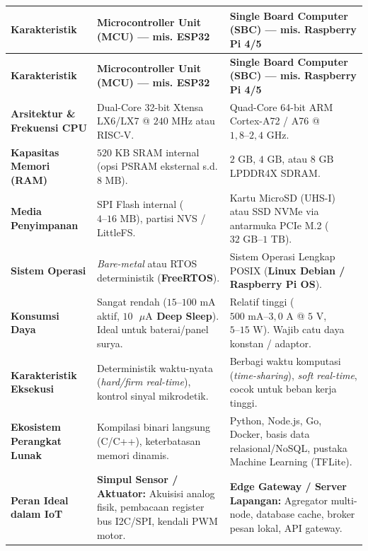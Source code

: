 \documentclass[11pt,a4paper]{article}
\begin{document}
{\small
\begin{longtable}{|L{2.8cm}|L{6.6cm}|L{6.6cm}|}
\hline
{}
\textbf{Karakteristik} & \textbf{Microcontroller Unit (MCU) --- mis. ESP32} & \textbf{Single Board Computer (SBC) --- mis. Raspberry Pi 4/5} \\
\hline
\endfirsthead
\hline
{}
\textbf{Karakteristik} & \textbf{Microcontroller Unit (MCU) --- mis. ESP32} & \textbf{Single Board Computer (SBC) --- mis. Raspberry Pi 4/5} \\
\hline
\endhead
\textbf{Arsitektur \& Frekuensi CPU} & Dual-Core 32-bit Xtensa LX6/LX7 @ $240\text{ MHz}$ atau RISC-V. & Quad-Core 64-bit ARM Cortex-A72 / A76 @ $1{,}8\text{--}2{,}4\text{ GHz}$. \\
\hline
\textbf{Kapasitas Memori (RAM)} & $520\text{ KB}$ SRAM internal (opsi PSRAM eksternal s.d. $8\text{ MB}$). & $2\text{ GB}$, $4\text{ GB}$, atau $8\text{ GB}$ LPDDR4X SDRAM. \\
\hline
\textbf{Media Penyimpanan} & SPI Flash internal ($4\text{--}16\text{ MB}$), partisi NVS / LittleFS. & Kartu MicroSD (UHS-I) atau SSD NVMe via antarmuka PCIe M.2 ($32\text{ GB}\text{--}1\text{ TB}$). \\
\hline
\textbf{Sistem Operasi} & \textit{Bare-metal} atau RTOS deterministik (\textbf{FreeRTOS}). & Sistem Operasi Lengkap POSIX (\textbf{Linux Debian / Raspberry Pi OS}). \\
\hline
\textbf{Konsumsi Daya} & Sangat rendah ($15\text{--}100\text{ mA}$ aktif, \textbf{$10\text{ }\mu\text{A}$ Deep Sleep}). Ideal untuk baterai/panel surya. & Relatif tinggi ($500\text{ mA}\text{--}3{,}0\text{ A}$ @ $5\text{ V}$, $5\text{--}15\text{ W}$). Wajib catu daya konstan / adaptor. \\
\hline
\textbf{Karakteristik Eksekusi} & Deterministik waktu-nyata (\textit{hard/firm real-time}), kontrol sinyal mikrodetik. & Berbagi waktu komputasi (\textit{time-sharing}), \textit{soft real-time}, cocok untuk beban kerja tinggi. \\
\hline
\textbf{Ekosistem Perangkat Lunak} & Kompilasi binari langsung (C/C++), keterbatasan memori dinamis. & Python, Node.js, Go, Docker, basis data relasional/NoSQL, pustaka Machine Learning (TFLite). \\
\hline
\textbf{Peran Ideal dalam IoT} & \textbf{Simpul Sensor / Aktuator:} Akuisisi analog fisik, pembacaan register bus I2C/SPI, kendali PWM motor. & \textbf{Edge Gateway / Server Lapangan:} Agregator multi-node, database cache, broker pesan lokal, API gateway. \\
\hline
\end{longtable}
}
\end{document}
